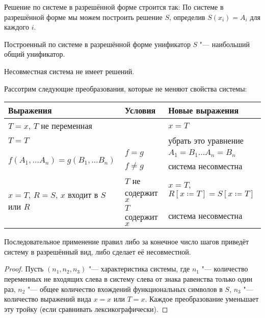 Решение по системе в разрешённой форме строится так:
По системе в разрешённой форме мы можем построить решение $S$, определив $S(x_i) = A_i$ для каждого $i$.
\todo

\begin{statement}
    Построенный по системе в разрешённой форме унификатор $S$ "--- наибольший общий унификатор.
\end{statement}

\begin{statement}
    Несовместная система не имеет решений.
\end{statement}

Рассотрим следующие преобразования, которые не меняют свойства системы:
\begin{center}
\begin{tabular}{l l l} \toprule
    Выражения                         & Условия             & Новые выражения \\ \midrule
    $T=x$, $T$ не переменная          &                     & $x=T$ \\ \midrule
    $T=T$                             &                     & убрать это уравнение \\ \midrule
    \multirow{2}{*}[-\aboverulesep]{$f(A_1, \ldots A_n) = g(B_1, \ldots B_n)$}
                                      & $f=g$               & $ A_1 = B_1 \ldots A_n = B_n$ \\ \cmidrule{2-3}
                                      & $f \neq g$          & система несовместна \\ \midrule
    \multirow{2}{*}[-\aboverulesep]{$x=T$, $R=S$, $x$ входит в $S$ или $R$}
                                      & $T$ не содержит $x$ & $x=T$,$R\left[x\coloneqq T\right]=S\left[x\coloneqq T\right]$\\ \cmidrule{2-3}
                                      & $T$ содержит $x$    & система несовместна \\ \bottomrule
\end{tabular}
\end{center}

\begin{statement}
    Последовательное применение правил либо за конечное число шагов приведёт систему в разрешённый вид, либо сделает её несовместной.
\end{statement}

\begin{proof} \todo
    Пусть $(n_1, n_2, n_3)$ "--- характеристика системы, где
    $n_1$ "--- количество переменных не входящих слева в систему слева от знака равенства только один раз,
    $n_2$ "--- общее количество вхождений функциональных символов в $S$,
    $n_3$ "--- количество выражений вида $x=x$ или $T=x$.
    Каждое преобразование уменьшает эту тройку (если сравнивать лексикографически).
\end{proof}

